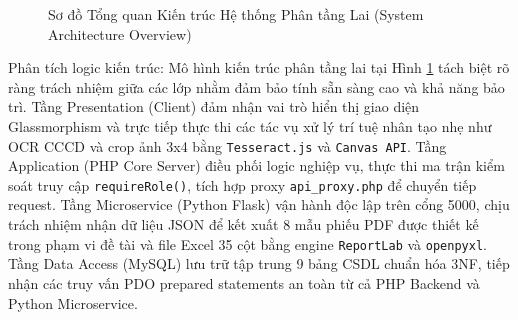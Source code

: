 \documentclass[12pt,a4paper]{report}
\begin{document}
\begin{figure}[htbp]
\begin{minipage}{\linewidth}
{}
    \vspace{0.2em}
    \caption{Sơ đồ Tổng quan Kiến trúc Hệ thống Phân tầng Lai (System Architecture Overview)}
    \label{fig:kientruc_phantang_detail}
  \end{minipage}
\end{figure}

Phân tích logic kiến trúc: Mô hình kiến trúc phân tầng lai tại Hình \ref{fig:kientruc_phantang_detail} tách biệt rõ ràng trách nhiệm giữa các lớp nhằm đảm bảo tính sẵn sàng cao và khả năng bảo trì. Tầng Presentation (Client) đảm nhận vai trò hiển thị giao diện Glassmorphism và trực tiếp thực thi các tác vụ xử lý trí tuệ nhân tạo nhẹ như OCR CCCD và crop ảnh 3x4 bằng \texttt{Tesseract.js} và \texttt{Canvas API}. Tầng Application (PHP Core Server) điều phối logic nghiệp vụ, thực thi ma trận kiểm soát truy cập \texttt{requireRole()}, tích hợp proxy \texttt{api\_proxy.php} để chuyển tiếp request. Tầng Microservice (Python Flask) vận hành độc lập trên cổng 5000, chịu trách nhiệm nhận dữ liệu JSON để kết xuất 8 mẫu phiếu PDF được thiết kế trong phạm vi đề tài và file Excel 35 cột bằng engine \texttt{ReportLab} và \texttt{openpyxl}. Tầng Data Access (MySQL) lưu trữ tập trung 9 bảng CSDL chuẩn hóa 3NF, tiếp nhận các truy vấn PDO prepared statements an toàn từ cả PHP Backend và Python Microservice.
\end{document}
